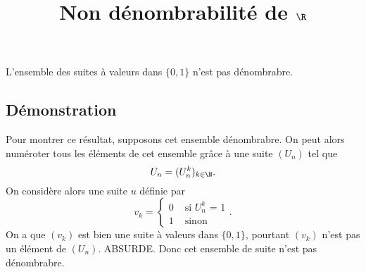 \documentclass[fontsize=12pt,twoside=false,parskip=half, french]{scrartcl}
\title{Non dénombrabilité de $\R$}
\date{}
\author{}
\begin{document}
\maketitle
   \begin{Theoreme}
      L’ensemble des suites à valeurs dans $\{0, 1\}$ n’est pas dénombrabre.
   \end{Theoreme}
   \subsection{Démonstration}
      Pour montrer ce résultat, supposons cet ensemble dénombrabre. On peut alors
      numéroter tous les éléments de cet ensemble grâce à une suite $(U_n)$ tel que
      \[
         U_n = (U_n^k)_{k \in \N}.
      \]
      On considère alors une suite $u$ définie par
      \[
         v_k =
         \begin{cases}
            0 & \text{ si $U_n^k$ = 1} \\
            1 & \text{ sinon}
         \end{cases}.
      \]
      On a que $(v_k)$ est bien une suite à valeurs dans $\{0, 1\}$, pourtant $(v_k)$ 
      n’est pas un élément de $(U_n)$. ABSURDE. Donc cet ensemble de suite n’est pas 
      dénombrabre.
\end{document}

